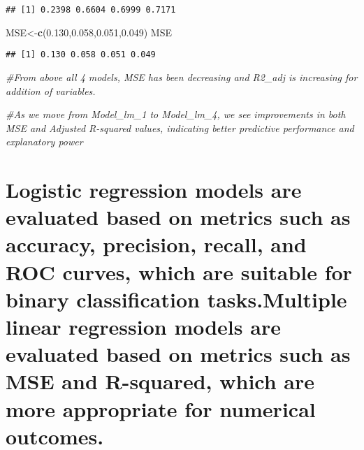 \documentclass[
]{article}
\newenvironment{Shaded}{\begin{snugshade}}{\end{snugshade}}
\newcommand{\CommentTok}[1]{\textcolor[rgb]{0.56,0.35,0.01}{\textit{#1}}}
\newcommand{\FloatTok}[1]{\textcolor[rgb]{0.00,0.00,0.81}{#1}}
\newcommand{\FunctionTok}[1]{\textcolor[rgb]{0.13,0.29,0.53}{\textbf{#1}}}
\newcommand{\NormalTok}[1]{#1}
\newcommand{\OtherTok}[1]{\textcolor[rgb]{0.56,0.35,0.01}{#1}}
\begin{document}
\begin{verbatim}
## [1] 0.2398 0.6604 0.6999 0.7171
\end{verbatim}

\begin{Shaded}
\begin{Highlighting}[]
\NormalTok{MSE}\OtherTok{\textless{}{-}}\FunctionTok{c}\NormalTok{(}\FloatTok{0.130}\NormalTok{,}\FloatTok{0.058}\NormalTok{,}\FloatTok{0.051}\NormalTok{,}\FloatTok{0.049}\NormalTok{)}
\NormalTok{MSE}
\end{Highlighting}
\end{Shaded}

\begin{verbatim}
## [1] 0.130 0.058 0.051 0.049
\end{verbatim}

\begin{Shaded}
\begin{Highlighting}[]
\CommentTok{\#From above all 4 models, MSE has been decreasing and R2\_adj is increasing for addition of variables.}

\CommentTok{\#As we move from Model\_lm\_1 to Model\_lm\_4, we see improvements in both MSE and Adjusted R{-}squared values, indicating better predictive performance and explanatory power}
\end{Highlighting}
\end{Shaded}

\hypertarget{logistic-regression-models-are-evaluated-based-on-metrics-such-as-accuracy-precision-recall-and-roc-curves-which-are-suitable-for-binary-classification-tasks.multiple-linear-regression-models-are-evaluated-based-on-metrics-such-as-mse-and-r-squared-which-are-more-appropriate-for-numerical-outcomes.}{%
\section{Logistic regression models are evaluated based on metrics such
as accuracy, precision, recall, and ROC curves, which are suitable for
binary classification tasks.Multiple linear regression models are
evaluated based on metrics such as MSE and R-squared, which are more
appropriate for numerical
outcomes.}\label{logistic-regression-models-are-evaluated-based-on-metrics-such-as-accuracy-precision-recall-and-roc-curves-which-are-suitable-for-binary-classification-tasks.multiple-linear-regression-models-are-evaluated-based-on-metrics-such-as-mse-and-r-squared-which-are-more-appropriate-for-numerical-outcomes.}}
\end{document}
